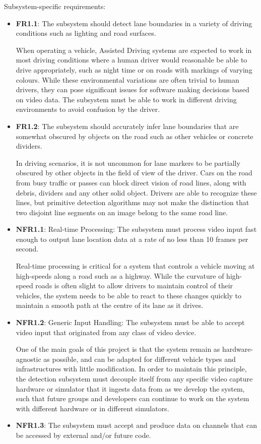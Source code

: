 \documentclass[titlepage]{article}
\begin{document}
Subsystem-specific requirements:
\begin{itemize}
	\item \textbf{FR1.1}: The subsystem should detect lane boundaries in a variety of driving conditions such as lighting and
	      road surfaces.

	      When operating a vehicle, Assisted Driving systems are expected to work in most driving conditions where a human driver
	      would reasonable be able to drive appropriately, such as night time or on roads with markings of varying colours.
	      While these environmental variations are often trivial to human drivers, they can pose significant issues for software
	      making decisions based on video data.
	      The subsystem must be able to work in different driving environments to avoid confusion by the driver.
	\item \textbf{FR1.2}: The subsystem should accurately infer lane boundaries that are somewhat obscured by objects on the
	      road such as other vehicles or concrete dividers.

	      In driving scenarios, it is not uncommon for lane markers to be partially obscured by other objects in the field of view
	      of the driver.
	      Cars on the road from busy traffic or passes can block direct vision of road lines, along with debris, dividers and any
	      other solid object.
	      Drivers are able to recognize these lines, but primitive detection algorithms may not make the distinction that two disjoint
	      line segments on an image belong to the same road line.
	\item \textbf{NFR1.1}: Real-time Processing: The subsystem must process video input fast enough to output lane location data
	      at a rate of no less than 10 frames per second.

	      Real-time processing is critical for a system that controls a vehicle moving at high-speeds along a road such as a highway.
	      While the curvature of high-speed roads is often slight to allow drivers to maintain control of their vehicles, the
	      system needs to be able to react to these changes quickly to maintain a smooth path at the centre of its lane as it drives.
	\item \textbf{NFR1.2}: Generic Input Handling: The subsystem must be able to accept video input that originated from any
	      class of video device.

	      One of the main goals of this project is that the system remain as hardware-agnostic as possible, and can be adapted for
	      different vehicle types and infrastructures with little modification.
	      In order to maintain this principle, the detection subsystem must decouple itself from any specific video capture hardware or
	      simulator that it ingests data from as we develop the system, such that future groups and developers can continue to work
	      on the system with different hardware or in different simulators.
	\item \textbf{NFR1.3}: The subsystem must accept and produce data on channels that can be accessed by external and/or future code.


\end{itemize}
\end{document}
